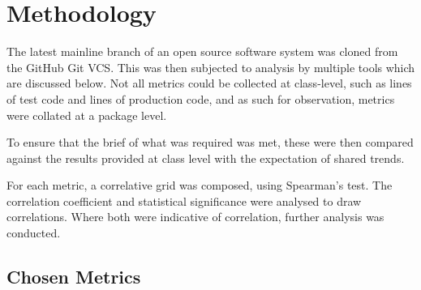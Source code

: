 \section{Methodology}

The latest mainline branch of an open source software system was cloned from the GitHub Git VCS. This was then subjected to analysis by multiple tools which are discussed below. Not all metrics could be collected at class-level, such as lines of test code and lines of production code, and as such for observation, metrics were collated at a package level.

To ensure that the brief of what was required was met, these were then compared against the results provided at class level with the expectation of shared trends. 

For each metric, a correlative grid was composed, using Spearman's test. The correlation coefficient and statistical significance were analysed to draw correlations. Where both were indicative of correlation, further analysis was conducted.

\subsection{Chosen Metrics}

